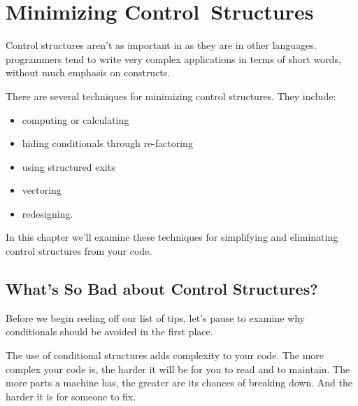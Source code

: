 

\chapter{Minimizing Control~Structures}%
%

Control structures aren't as important in \Forth{} as they are in other
languages. \Forth{} programmers tend to write very complex applications
in terms of short words, without much emphasis on 
constructs.

There are several techniques for minimizing control structures.
They include:

\begin{itemize}
\item computing or calculating
\item hiding conditionals through re-factoring
\item using structured exits
\item vectoring
\item redesigning.
\end{itemize}
In this chapter we'll examine these techniques for simplifying and
eliminating control structures from your code.

\section{What's So Bad about Control Structures?}%

Before we begin reeling off our list of tips, let's pause to examine why
conditionals should be avoided in the first place.

The use of conditional structures adds complexity to your code. The
more complex your code is, the harder it will be for you to read and to
maintain. The more parts a machine has, the greater are its chances of
breaking down. And the harder it is for someone to fix.

